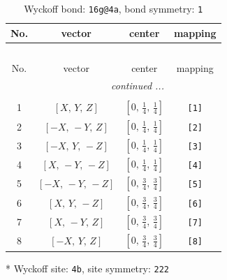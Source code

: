 \documentclass[fleqn,8pt]{jsarticle}
\begin{document}
\renewcommand{\arraystretch}{1.2}
\begin{longtable}{cccc}
\caption{Wyckoff bond: {\tt 16g@4a}, bond symmetry: {\tt 1}}
 \\
 \hline \hline
No. & vector & center & mapping \\ \hline \endfirsthead

\multicolumn{3}{l}{\tablename\ \thetable{}} \\
 \hline \hline
No. & vector & center & mapping \\ \hline \endhead

 \hline \hline
\multicolumn{3}{r}{\footnotesize\it continued ...} \\ \endfoot

 \hline \hline
\multicolumn{3}{r}{} \\ \endlastfoot

1 & $\left[ X,\, Y,\, Z \right]$ & $\left[ 0,\, \frac{1}{4},\, \frac{1}{4} \right]$ & {\tt [1]} \\ \hline
2 & $\left[ - X,\, - Y,\, Z \right]$ & $\left[ 0,\, \frac{1}{4},\, \frac{1}{4} \right]$ & {\tt [2]} \\ \hline
3 & $\left[ - X,\, Y,\, - Z \right]$ & $\left[ 0,\, \frac{1}{4},\, \frac{1}{4} \right]$ & {\tt [3]} \\ \hline
4 & $\left[ X,\, - Y,\, - Z \right]$ & $\left[ 0,\, \frac{1}{4},\, \frac{1}{4} \right]$ & {\tt [4]} \\ \hline
5 & $\left[ - X,\, - Y,\, - Z \right]$ & $\left[ 0,\, \frac{3}{4},\, \frac{3}{4} \right]$ & {\tt [5]} \\ \hline
6 & $\left[ X,\, Y,\, - Z \right]$ & $\left[ 0,\, \frac{3}{4},\, \frac{3}{4} \right]$ & {\tt [6]} \\ \hline
7 & $\left[ X,\, - Y,\, Z \right]$ & $\left[ 0,\, \frac{3}{4},\, \frac{3}{4} \right]$ & {\tt [7]} \\ \hline
8 & $\left[ - X,\, Y,\, Z \right]$ & $\left[ 0,\, \frac{3}{4},\, \frac{3}{4} \right]$ & {\tt [8]} \\
\end{longtable}
* Wyckoff site: {\tt 4b}, site symmetry: {\tt 222}
\renewcommand{\arraystretch}{1.2}
\end{document}
